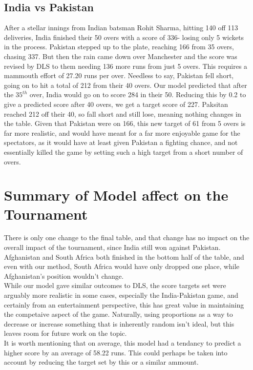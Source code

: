 \subsection{India vs Pakistan}
After a stellar innings from Indian batsman Rohit Sharma, hitting 140 off 113 deliveries, India finished their 50 overs with a score of 336- losing only 5 wickets in the process. Pakistan stepped up to the plate, reaching 
166 from 35 overs, chasing 337. But then the rain came down over Manchester and the score was revised by DLS to them needing 136 more runs from just 5 overs. This requires a mammouth effort of 27.20 runs per over. Needless to say,
Pakistan fell short, going on to hit a total of 212 from their 40 overs. Our model predicted that after the $35^{th}$ over, India would go on to score 284 in their 50. Reducing this by 0.2 to give a predicted score after 40 overs, 
we get a target score of 227. Paksitan reached 212 off their 40, so fall short and still lose, meaning nothing changes in the table. Given that Pakistan were on 166, this new target of 61 from 5 overs is far more realistic, and would have 
meant for a far more enjoyable game for the spectators, as it would have at least given Pakistan a fighting chance, and not essentially killed the game by setting such a high target from a short number 
of overs. 

\section{Summary of Model affect on the Tournament}
There is only one change to the final table, and that change has no impact on the overall impact of the tournament, since India still won against Pakistan. Afghanistan and South Africa both finished in the bottom 
half of the table, and even with our method, South Africa would have only dropped one place, while Afghanistan's position wouldn't change. \\

While our model gave similar outcomes to DLS, the score targets set were arguably more realistic in some cases, especially the India-Pakistan game, and certainly from an entertainment perspective, this 
has great value in maintaining the competaive aspect of the game. Naturally, using proportions as a way to decrease or increase something that is inherently random isn't ideal, but this leaves room for future work 
on the topic.  \\

It is worth mentioning that on average, this model had a tendancy to predict a higher score by an average of 58.22 runs. This could perhaps be taken into account by reducing the target set by this or a similar 
ammount. 